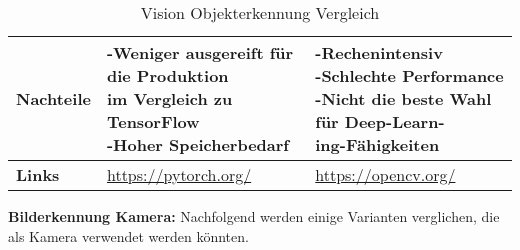 \begin{table}[H]
\begin{tabularx}{\textwidth}{|l|X|X|}
  \hline
  \textbf{Nachteile} & \makecell{-Weniger ausgereift für die Produktion \\ im Vergleich zu TensorFlow \\ -Hoher Speicherbedarf} & \makecell{-Rechenintensiv \\ -Schlechte Performance \\ -Nicht die beste Wahl für Deep-Learn-\\ing-Fähigkeiten} \\
  \hline
  \textbf{Links} & \url{https://pytorch.org/} & \url{https://opencv.org/} \\
  \hline
\end{tabularx}
\caption{Vision Objekterkennung Vergleich}
\label{table:vision-object-detection-compare}
\end{table}

\newpage

\textbf{Bilderkennung Kamera:} Nachfolgend werden einige Varianten verglichen, die als Kamera verwendet werden könnten.


